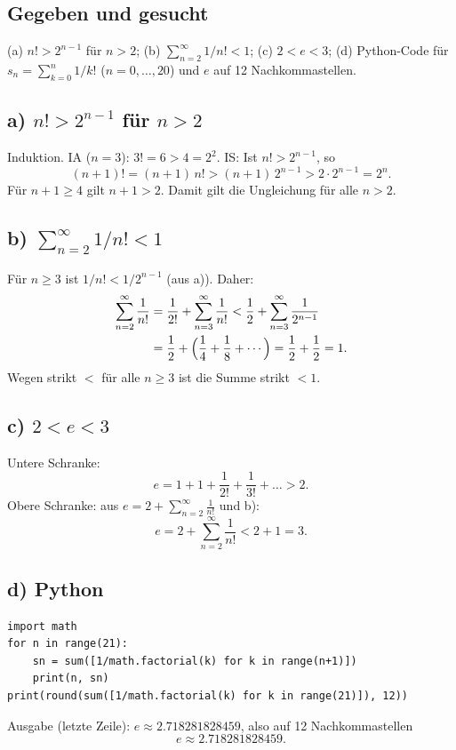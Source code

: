 

\subsection*{Gegeben und gesucht}
(a) $n!>2^{n-1}$ f\"ur $n>2$; (b) $\sum_{n=2}^{\infty}1/n!<1$; (c) $2<e<3$;
(d) Python-Code f\"ur $s_n=\sum_{k=0}^{n}1/k!$ ($n=0,\dots,20$) und $e$ auf
12 Nachkommastellen.

\subsection*{a) $n!>2^{n-1}$ f\"ur $n>2$}
Induktion. IA ($n=3$): $3!=6>4=2^{2}$. \checkmark
IS: Ist $n!>2^{n-1}$, so
\begin{equation}
  (n+1)!=(n+1)\,n!>(n+1)\,2^{n-1}>2\cdot2^{n-1}=2^{n}.
\end{equation}
F\"ur $n+1\ge4$ gilt $n+1>2$. Damit gilt die Ungleichung f\"ur alle
$n>2$.

\subsection*{b) $\sum_{n=2}^{\infty}1/n!<1$}
F\"ur $n\ge3$ ist $1/n!<1/2^{n-1}$ (aus a)). Daher:
\begin{align}
  \sum_{n=2}^{\infty}\frac1{n!}
  &=\frac1{2!}+\sum_{n=3}^{\infty}\frac1{n!}
  <\frac12+\sum_{n=3}^{\infty}\frac1{2^{n-1}} \\
  &=\frac12+\Bigl(\frac14+\frac18+\cdots\Bigr)
  =\frac12+\frac12=1 .
\end{align}
Wegen strikt $<$ f\"ur alle $n\ge3$ ist die Summe strikt $<1$.

\subsection*{c) $2<e<3$}
Untere Schranke:
\begin{equation}
  e=1+1+\frac1{2!}+\frac1{3!}+\dots>2 .
\end{equation}
Obere Schranke: aus $e=2+\sum_{n=2}^\infty\frac1{n!}$ und b):
\begin{equation}
  e=2+\sum_{n=2}^{\infty}\frac1{n!}<2+1=3 .
\end{equation}

\subsection*{d) Python}
\begin{verbatim}
import math
for n in range(21):
    sn = sum([1/math.factorial(k) for k in range(n+1)])
    print(n, sn)
print(round(sum([1/math.factorial(k) for k in range(21)]), 12))
\end{verbatim}
Ausgabe (letzte Zeile): $e\approx2.\!718281828459$, also auf 12
Nachkommastellen
\begin{equation}
  e\approx2.\!718281828459 .
\end{equation}

